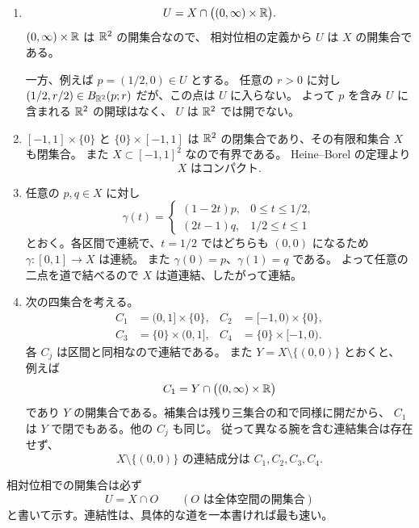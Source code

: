 \begin{enumerate}
  \item
  \[
  U=X\cap\bigl((0,\infty)\times\mathbb R\bigr).
  \]
  \((0,\infty)\times\mathbb R\) は \(\mathbb R^2\) の開集合なので、
  相対位相の定義から \(U\) は \(X\) の開集合である。

  一方、例えば \(p=(1/2,0)\in U\) とする。
  任意の \(r>0\) に対し
  \((1/2,r/2)\in B_{\mathbb R^2}(p;r)\) だが、この点は \(U\) に入らない。
  よって \(p\) を含み \(U\) に含まれる \(\mathbb R^2\) の開球はなく、
  \(U\) は \(\mathbb R^2\) では開でない。

  \item \([-1,1]\times\{0\}\) と \(\{0\}\times[-1,1]\) は
  \(\mathbb R^2\) の閉集合であり、その有限和集合 \(X\) も閉集合。
  また \(X\subset[-1,1]^2\) なので有界である。
  Heine--Borel の定理より
  \[
  \boxed{X\text{ はコンパクト}}.
  \]

  \item 任意の \(p,q\in X\) に対し
  \[
  \gamma(t)=
  \begin{cases}
  (1-2t)p,&0\le t\le1/2,\\
  (2t-1)q,&1/2\le t\le1
  \end{cases}
  \]
  とおく。各区間で連続で、\(t=1/2\) ではどちらも \((0,0)\) になるため
  \(\gamma:[0,1]\to X\) は連続。
  また \(\gamma(0)=p\)、\(\gamma(1)=q\) である。
  よって任意の二点を道で結べるので \(X\) は道連結、したがって連結。

  \item 次の四集合を考える。
  \[
  \begin{aligned}
  C_1&=(0,1]\times\{0\},&
  C_2&=[-1,0)\times\{0\},\\
  C_3&=\{0\}\times(0,1],&
  C_4&=\{0\}\times[-1,0).
  \end{aligned}
  \]
  各 \(C_j\) は区間と同相なので連結である。
  また \(Y=X\setminus\{(0,0)\}\) とおくと、
  例えば
  \[
  C_1=Y\cap\bigl((0,\infty)\times\mathbb R\bigr)
  \]
  であり \(Y\) の開集合である。補集合は残り三集合の和で同様に開だから、
  \(C_1\) は \(Y\) で閉でもある。他の \(C_j\) も同じ。
  従って異なる腕を含む連結集合は存在せず、
  \[
  \boxed{X\setminus\{(0,0)\}\text{ の連結成分は }C_1,C_2,C_3,C_4}.
  \]
\end{enumerate}

\begin{pointbox}[確認]
相対位相での開集合は必ず
\[
U=X\cap O\qquad(O\text{ は全体空間の開集合})
\]
と書いて示す。連結性は、具体的な道を一本書ければ最も速い。
\end{pointbox}



